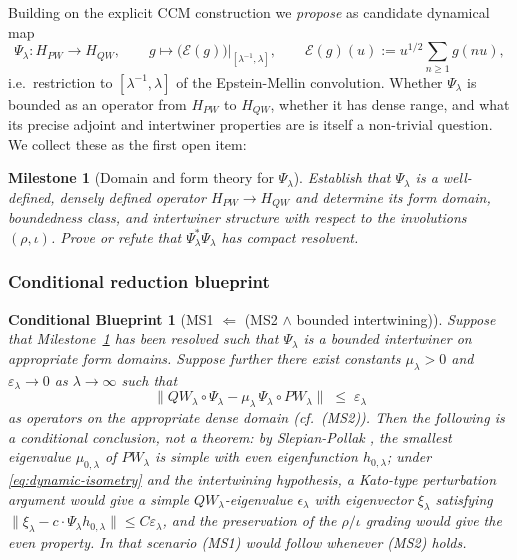 \documentclass[11pt,a4paper]{article}
\theoremstyle{plain}
\newtheorem{blueprint}[theorem]{Conditional Blueprint}
\newtheorem{milestone}[theorem]{Milestone}
\theoremstyle{definition}
\begin{document}
Building on the explicit CCM construction we \emph{propose} as
candidate dynamical map
\[
  \Psi_\lambda : H_{PW} \longrightarrow H_{QW}, \qquad
    g \mapsto \big(\mathcal E(g)\big)\big|_{[\lambda^{-1},\lambda]},
  \qquad \mathcal E(g)(u) := u^{1/2} \sum_{n \ge 1} g(nu),
\]
i.e.\ restriction to $[\lambda^{-1},\lambda]$ of the Epstein-Mellin
convolution.  Whether $\Psi_\lambda$ is bounded as an operator from
$H_{PW}$ to $H_{QW}$, whether it has dense range, and what its
precise adjoint and intertwiner properties are is itself a
non-trivial question.  We collect these as the first open item:

\begin{milestone}[Domain and form theory for $\Psi_\lambda$]
\label{ms:psi-domain}
Establish that $\Psi_\lambda$ is a well-defined, densely defined
operator $H_{PW} \to H_{QW}$ and determine its form domain,
boundedness class, and intertwiner structure with respect to the
involutions $(\rho, \iota)$.  Prove or refute that
$\Psi_\lambda^\ast \Psi_\lambda$ has compact resolvent.
\end{milestone}

\subsubsection{Conditional reduction blueprint}

\begin{blueprint}[MS1 $\Leftarrow$ (MS2 $\wedge$ bounded intertwining)]
\label{bp:fst-transfer}
Suppose that Milestone~\ref{ms:psi-domain} has been resolved such
that $\Psi_\lambda$ is a bounded intertwiner on appropriate form
domains.  Suppose further there exist constants $\mu_\lambda > 0$
and $\varepsilon_\lambda \to 0$ as $\lambda \to \infty$ such that
\begin{equation}\label{eq:dynamic-isometry}
  \big\| QW_\lambda \circ \Psi_\lambda
    - \mu_\lambda \, \Psi_\lambda \circ PW_\lambda \big\|
  \;\le\; \varepsilon_\lambda
\end{equation}
as operators on the appropriate dense domain (cf.~(MS2)).  Then the
following is a conditional conclusion, not a theorem: by
Slepian-Pollak \cite{SlepianPollack1961}, the smallest eigenvalue
$\mu_{0,\lambda}$ of $PW_\lambda$ is simple with even eigenfunction
$h_{0,\lambda}$; under \eqref{eq:dynamic-isometry} and the
intertwining hypothesis, a Kato-type perturbation argument
\cite{Kato} would give a simple $QW_\lambda$-eigenvalue
$\epsilon_\lambda$ with eigenvector $\xi_\lambda$ satisfying
$\|\xi_\lambda - c \cdot \Psi_\lambda h_{0,\lambda}\| \le
C \varepsilon_\lambda$, and the preservation of the $\rho/\iota$
grading would give the even property.  In that scenario
(MS1) would follow whenever (MS2) holds.
\end{blueprint}
\end{document}
